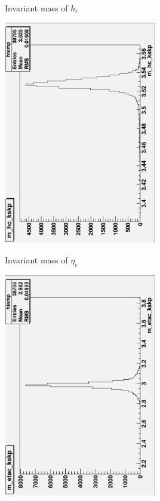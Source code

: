 \documentclass{beamer}
\begin{document}
\begin{frame}{Invariant mass of $h_c$}
\begin{center}
\includegraphics[width=0.5\textwidth,angle=270]{figures/m_hc_kskp.eps}
\end{center}
\end{frame}
\begin{frame}{Invariant mass of ${\eta}_c$}
\begin{center}
\includegraphics[width=0.5\textwidth,angle=270]{figures/m_etac_kskp.eps}
\end{center}
\end{frame}
\end{document}
